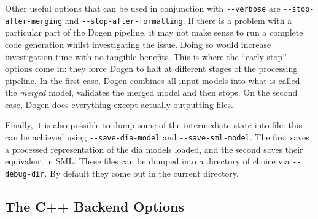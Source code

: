 \documentclass{book}
\begin{document}
Other useful options that can be used in conjunction with
\texttt{-{}-verbose} are \texttt{-{}-stop-after-merging} and
\texttt{-{}-stop-after-formatting}. If there is a problem with a
particular part of the Dogen pipeline, it may not make sense to run a
complete code generation whilst investigating the issue. Doing so
would increase investigation time with no tangible benefits. This is
where the ``early-stop'' options come in: they force Dogen to halt at
different stages of the processing pipeline. In the first case, Dogen
combines all input models into what is called the \emph{merged} model,
validates the merged model and then stops. On the second case, Dogen
does everything except actually outputting files.

Finally, it is also possible to dump some of the intermediate state
into file: this can be achieved using \texttt{-{}-save-dia-model} and
\texttt{-{}-save-sml-model}. The first saves a processed
representation of the dia models loaded, and the second saves their
equivalent in SML. These files can be dumped into a directory of
choice via \texttt{-{}-debug-dir}. By default they come out in the
current directory.

\subsection{The C++ Backend Options}
\end{document}
